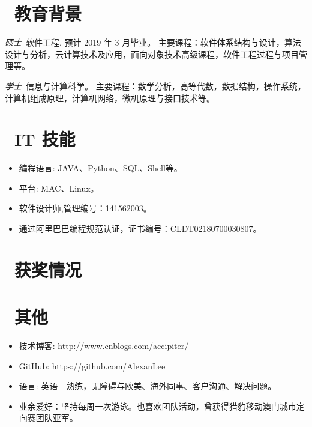 \documentclass{resume}
\begin{document}
\section{\faGraduationCap\  教育背景}
\textit{硕士}\ 软件工程, 预计 2019 年 3 月毕业。
 主要课程：软件体系结构与设计，算法设计与分析，云计算技术及应用，面向对象技术高级课程，软件工程过程与项目管理等。

\textit{学士}\ 信息与计算科学。
 主要课程：数学分析，高等代数，数据结构，操作系统，计算机组成原理，计算机网络，微机原理与接口技术等。



\section{\faCogs\ IT 技能}
\begin{itemize}[parsep=0.5ex]
  \item 编程语言: JAVA、Python、SQL、Shell等。
  \item 平台: MAC、Linux。
  \item 软件设计师,管理编号：141562003。
  \item 通过阿里巴巴编程规范认证，证书编号：CLDT02180700030807。
\end{itemize}

\section{\faHeartO\ 获奖情况}

\section{\faInfo\ 其他}
\begin{itemize}[parsep=0.5ex]
  \item 技术博客: http://www.cnblogs.com/accipiter/
  \item GitHub: https://github.com/AlexanLee
  \item 语言: 英语 - 熟练，无障碍与欧美、海外同事、客户沟通、解决问题。
  \item 业余爱好：坚持每周一次游泳。也喜欢团队活动，曾获得猎豹移动澳门城市定向赛团队亚军。
\end{itemize}

%
%
\end{document}
